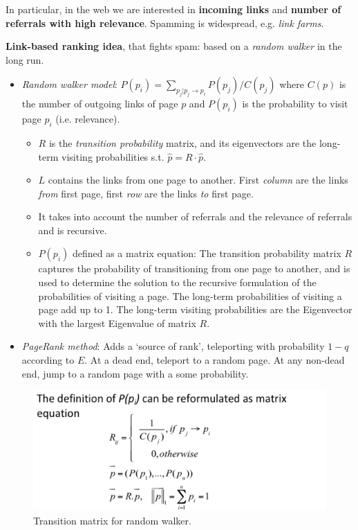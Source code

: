     In particular, in the web we are interested in \textbf{incoming links} and \textbf{number of referrals with high relevance}. Spamming is widespread, e.g. \emph{link farms}.

    \textbf{Link-based ranking idea}, that fights spam: based on a \emph{random walker} in the long run.
    \begin{itemize}
      \item \emph{Random walker model}: $P(p_i) = \sum_{p_j|p_j\rightarrow p_i}{P(p_j)/C(p_j)}$ where $C(p)$ is the number of outgoing links of page $p$ and $P(p_i)$ is the probability to visit page $p_i$ (i.e. relevance).
      \begin{itemize}
        \item $R$ is the \emph{transition probability} matrix, and its eigenvectors are the long-term visiting probabilities s.t. $\hat{p}=R\cdot \hat{p}$.
        \item $L$ contains the links from one page to another. First \emph{column} are the links \emph{from} first page, first \emph{row} are the links \emph{to} first page.
        \item It takes into account the number of referrals and the relevance of referrals and is recursive.
        \item $P(p_i)$ defined as a matrix equation: The transition probability matrix $R$ captures the probability of transitioning from one page to another, and is used to determine the solution to the recursive formulation of the probabilities of visiting a page. The long-term probabilities of visiting a page add up to 1. The long-term visiting probabilities are the Eigenvector with the largest Eigenvalue of matrix $R$.
      \end{itemize}
      \item \emph{PageRank method}: Adds a `source of rank', teleporting with probability $1-q$ according to $E$. At a dead end, teleport to a random page. At any non-dead end, jump to a random page with a some probability.
    \end{itemize}
    \begin{figure}[htp]
      \centering
        \includegraphics[width=.65\textwidth]{images/matrixformlb.png}
        \caption{Transition matrix for random walker.}
        \label{fig:matrixformlb}
    \end{figure}

